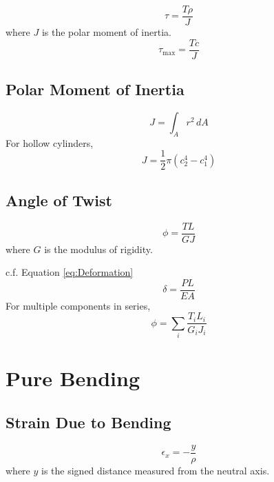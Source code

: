 \documentclass[twoside]{article}
\begin{document}
	\begin{equation}
		\tau = \frac{T \rho}{J}
		\label{eq:ShearingStressTwist}
	\end{equation}
	where $J$ is the polar moment of inertia.
	\begin{equation}
		\tau_\text{max} = \frac{Tc}{J}
		\label{eq:ShearingStressTwistMax}
	\end{equation}
	
	\subsection{Polar Moment of Inertia}
	\begin{equation}
		J = \int_A r^2 \, dA
		\label{eq:PolarMomentOfInertia}
	\end{equation}
	For hollow cylinders,
	\begin{equation}
		J = \frac{1}{2} \pi \left( c_2^4-c_1^4 \right)
		\label{eq:PolarMomentOfInertiaCylinder}
	\end{equation}
	
	\subsection{Angle of Twist}
	\begin{equation}
		\phi = \frac{TL}{GJ}
		\label{eq:AngleOfTwist}
	\end{equation}
	where $G$ is the modulus of rigidity.
	
	c.f. Equation \ref{eq:Deformation}
	\begin{equation*}
		\delta = \frac{PL}{EA}
	\end{equation*}
	For multiple components in series,
	\begin{equation}
		\phi = \sum_i \frac{T_i L_i}{G_i J_i}
		\label{eq:AngleOfTwistSeries}
	\end{equation}
	
	\newpage
	
	\section{Pure Bending}
	
	\subsection{Strain Due to Bending}
	
	\begin{equation}
		\epsilon_x = -\frac{y}{\rho}
		\label{eq:BendingStrain}
	\end{equation}
	where $y$ is the signed distance measured from the neutral axis.
	
\end{document}
